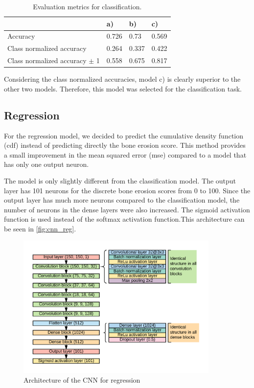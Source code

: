 \documentclass[12pt]{article}
\begin{document}
\begin{table}[ht]
\centering
\caption{Evaluation metrics for classification.}
\label{tab:metrics_cla}
\begin{tabular}{@{}llll@{}}
\toprule
                                & a)    & b)    & c)    \\ \midrule
Accuracy                        & 0.726 & 0.73 & 0.569 \\
Class normalized accuracy       & 0.264 & 0.337 & 0.422 \\
Class normalized accuracy $\pm$ 1 & 0.558 & 0.675 & 0.817 \\ \bottomrule
\end{tabular}
\end{table}

Considering the class normalized accuracies, model c) is clearly superior to the other two models. Therefore, this model was selected for the classification task.

\subsection{Regression}
\label{subsec:reg}


For the regression model, we decided to predict the cumulative density function (cdf) instead of predicting directly the bone erosion score. This method provides a small improvement in the mean squared error (mse) compared to a model that has only one output neuron.

The model is only slightly different from the classification model. The output layer has 101 neurons for the discrete bone erosion scores from 0 to 100. Since the output layer has much more neurons compared to the classification model, the number of neurons in the dense layers were also increased. The sigmoid activation function is used instead of the softmax activation function.This architecture can be seen in \autoref{fig:cnn_reg}.

\begin{figure}[ht]
\includegraphics[width=10cm]{cnn_regression}	
\caption{Architecture of the CNN for regression}
\label{fig:cnn_reg}
\end{figure}
\end{document}

